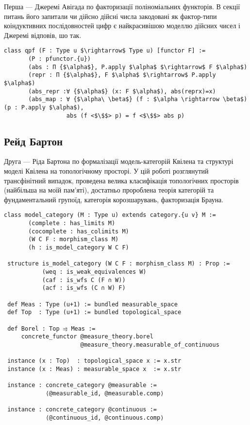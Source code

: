Перша --- Джеремі Авігада по факторизації поліноміальних функторів.
В секції питань його запитали чи дійсно дійсні числа закодовані як
фактор-типи коіндуктивних послідовностей цифр є найкрасивішою
моделлю дійсних чисел і Джеремі відповів, шо так.

\begin{lstlisting}[mathescape=true]
 class qpf (F : Type u $\rightarrow$ Type u) [functor F] :=
       (P : pfunctor.{u})
       (abs : Π {$\alpha$}, P.apply $\alpha$ $\rightarrow$ F $\alpha$)
       (repr : Π {$\alpha$}, F $\alpha$ $\rightarrow$ P.apply $\alpha$)
       (abs_repr :∀ {$\alpha$} (x: F $\alpha$), abs(reprx)=x)
       (abs_map : ∀ {$\alpha\ \beta$} (f : $\alpha \rightarrow \beta$) (p : P.apply $\alpha$),
                  abs (f <$\$$> p) = f <$\$$> abs p)
\end{lstlisting}

\subsection*{Рейд Бартон}

Друга --- Ріда Бартона по формалізації модель-категорій Квілена та структурі
моделі Квілена на топологічному просторі. У цій роботі розглянутий трансфінітний
випадок, проведена велика класифікація топологічних просторів (найбільша на моїй
пам'яті), достатньо пророблена теорія категорій та фундаментальний групоїд,
категорія корозшарувань, факторизація Брауна. 

\begin{lstlisting}[mathescape=true]
 class model_category (M : Type u) extends category.{u v} M :=
       (complete : has_limits M)
       (cocomplete : has_colimits M)
       (W C F : morphism_class M)
       (h : is_model_category W C F)

 structure is_model_category (W C F : morphism_class M) : Prop :=
           (weq : is_weak_equivalences W)
           (caf : is_wfs C (F ∩ W))
           (acf : is_wfs (C ∩ W) F)

 def Meas : Type (u+1) := bundled measurable_space
 def Top  : Type (u+1) := bundled topological_space

 def Borel : Top ⥤ Meas :=
     concrete_functor @measure_theory.borel
                      @measure_theory.measurable_of_continuous

 instance (x : Top)  : topological_space x := x.str
 instance (x : Meas) : measurable_space x  := x.str

 instance : concrete_category @measurable :=
            ⟨@measurable_id, @measurable.comp⟩

 instance : concrete_category @continuous :=
            ⟨@continuous_id, @continuous.comp⟩
\end{lstlisting}

